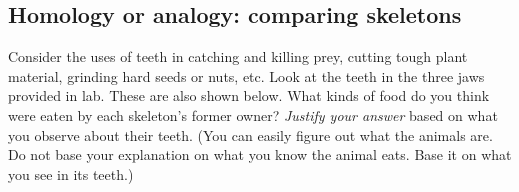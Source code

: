 \documentclass[12pt, hidelinks]{exam}
\newcommand*\AnswerBox[2]{%
    \parbox[t][#1]{0.92\textwidth}{%
    \begin{solution}#2\end{solution}}
}
\begin{document}
\subsection*{Homology or analogy: comparing skeletons}

\begin{questions}

\question
Consider the uses of teeth in catching and killing prey,
cutting tough plant material, grinding hard seeds or nuts, etc. Look at
the teeth in the three jaws provided in lab. These are also shown below.
What kinds of food do you think were eaten by each skeleton's former
owner? \emph{Justify your answer} based on what you observe about
their teeth. (You can easily figure out what the
animals are. Do not base your explanation on what you know the animal
eats. Base it on what you see in its teeth.)

\end{questions}
\end{document}
